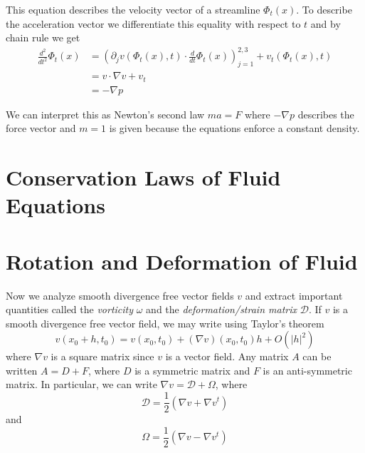 This equation describes the velocity vector of a streamline $\Phi_t(x)$. To describe the acceleration vector we differentiate this equality with respect to $t$ and by chain rule we get
\[\begin{aligned}
    \frac{d^2}{dt^2}\Phi_t(x) &= \left(\partial_jv(\Phi_t(x), t)\cdot \frac{d}{dt}\Phi_t(x)\right)_{j = 1}^{2,3} + v_t(\Phi_t(x), t) \\
    &= v \cdot \nabla v + v_t \\
    &= -\nabla p
\end{aligned}\]

We can interpret this as Newton's second law $ma = F$ where $-\nabla p$ describes the force vector and $m = 1$ is given because the equations enforce a constant density.

\section{Conservation Laws of Fluid Equations}



\section{Rotation and Deformation of Fluid}

Now we analyze smooth divergence free vector fields $v$ and extract important quantities called the \textit{vorticity} $\omega$ and the \textit{deformation/strain matrix} $\mathcal{D}$. If $v$ is a smooth divergence free vector field, we may write using Taylor's theorem
\[v(x_0 + h, t_0) = v(x_0, t_0) + (\nabla v)(x_0, t_0)h + O(|h|^2)\]
where $\nabla v$ is a square matrix since $v$ is a vector field. Any matrix $A$ can be written $A = D + F$, where $D$ is a symmetric matrix and $F$ is an anti-symmetric matrix. In particular, we can write $\nabla v = \mathcal{D} + \Omega$, where
\begin{equation}
    \mathcal{D} = \frac{1}{2}(\nabla v + \nabla v^t)
\end{equation}
and 
\begin{equation}
    \Omega = \frac{1}{2}(\nabla v - \nabla v^t)
\end{equation}